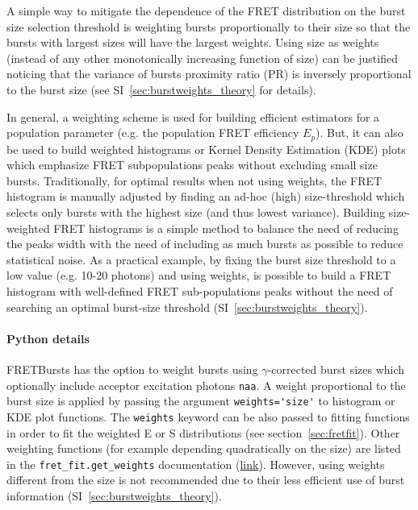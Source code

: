 A simple way to mitigate the dependence of the FRET distribution on 
the burst size selection threshold is weighting bursts proportionally to their size 
so that the bursts with largest sizes will have the largest weights.
Using size as weights (instead of any other monotonically increasing function
of size) can be justified noticing that the variance of bursts proximity ratio (PR) is
inversely proportional to the burst size (see SI~\ref{sec:burstweights_theory} for details). 

In general, a weighting scheme is used for building efficient estimators for a population
parameter (e.g. the population FRET efficiency $E_p$). 
But, it can also be used to build weighted histograms or Kernel Density
Estimation (KDE) plots which emphasize FRET subpopulations peaks 
without excluding small size bursts.
Traditionally, for optimal results when not using weights, the 
FRET histogram is manually adjusted by finding an ad-hoc (high) 
size-threshold which selects only bursts with the highest size (and thus lowest variance).
Building size-weighted FRET histograms is a simple method to balance 
the need of reducing the peaks width with the need of including as much bursts
as possible to reduce statistical noise.
As a practical example, by fixing the burst size threshold to a low value (e.g. 10-20 photons)
and using weights, is possible to build a FRET histogram with well-defined FRET sub-populations peaks 
without the need of searching an optimal burst-size threshold (SI~\ref{sec:burstweights_theory}).

\paragraph{Python details}
FRETBursts has the option to weight bursts using $\gamma$-corrected
burst sizes which optionally include acceptor excitation photons \verb|naa|.
A weight proportional to the burst size is applied by passing the argument
\verb|weights='size'| to histogram or KDE plot functions. The \verb|weights|
keyword can be also passed to fitting functions in order to fit
the weighted E or S distributions (see section~\ref{sec:fretfit}).
Other weighting functions (for example depending quadratically on the size) 
are listed in the \verb|fret_fit.get_weights| documentation
(\href{http://fretbursts.readthedocs.org/en/latest/fret_fit.html#fretbursts.fret_fit.get_weights}{link}).
However, using weights different from the size is not recommended 
due to their less efficient use of burst information
(SI~\ref{sec:burstweights_theory}).